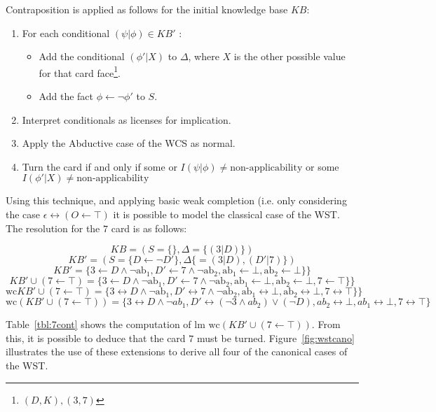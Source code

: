 Contraposition is applied as follows for the initial knowledge base $KB$:
\begin{enumerate}
\item For each conditional $(\psi|\phi)\in KB'$ :
\begin{itemize}
\item Add the conditional $(\phi'|X)$ to $\Delta$, where $X$ is the other possible value for that card face\footnote{$(D,K),(3,7)$}.
\item Add the fact $\phi\leftarrow \lnot \phi'$ to $S$.
\end{itemize}
\item Interpret conditionals as licenses for implication.
\item Apply the Abductive case of the WCS as normal.
\item Turn the card if and only if some or $I(\psi|\phi)\neq\textrm{non-applicability}$ or some $I(\phi'|X)\neq\textrm{non-applicability}$
\end{enumerate}

Using this technique, and applying basic weak completion (i.e. only considering the case $\epsilon\leftrightarrow(O\leftarrow \top)$ it is possible to model the classical case of the WST. The resolution for the $7$ card is as follows:

\[
KB = (S=\{\},\Delta=\{(3|D)\})
\]
\[
KB' = (S=\{D \leftarrow  \lnot D'\},\Delta\{=(3|D),(D'|7)\})
\]
\[
KB' = \{3 \leftarrow D \land \lnot \text{ab}_1, D' \leftarrow 7 \land \lnot \text{ab}_2, \text{ab}_1 \leftarrow \bot, \text{ab}_2 \leftarrow \bot\}\}
\]
\[
KB'\cup (7\leftarrow\top) = \{3 \leftarrow D \land \lnot \text{ab}_1, D' \leftarrow 7 \land \lnot \text{ab}_2, \text{ab}_1 \leftarrow \bot, \text{ab}_2 \leftarrow \bot, 7 \leftarrow \top\}\}
\]
\[
\text{wc}KB'\cup (7\leftarrow\top) = \{3 \leftrightarrow D \land \lnot \text{ab}_1, D' \leftrightarrow 7 \land \lnot \text{ab}_2, \text{ab}_1 \leftrightarrow \bot, \text{ab}_2 \leftrightarrow \bot, 7 \leftrightarrow \top\}\}
\]
\begin{equation} \label{eqn:wst_contra}
\textrm{wc} (KB'\cup (7\leftarrow\top)) = \{3 \leftrightarrow D \land \lnot ab_1, D' \leftrightarrow (\lnot 3 \land ab_2) \lor (\lnot D),  ab_2\leftrightarrow \bot, ab_1\leftrightarrow \bot, 7\leftrightarrow\top \}
\end{equation}

Table~\ref{tbl:7cont} shows the computation of $\textrm{lm wc} (KB'\cup (7\leftarrow\top))$. From this, it is possible to deduce that the card $7$ must be turned. Figure~\ref{fig:wstcano} illustrates the use of these extensions to derive all four of the canonical cases of the WST.

